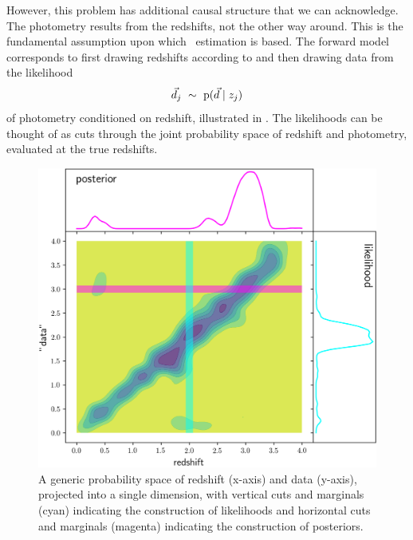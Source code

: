 However, this problem has additional causal structure that we can acknowledge.
The photometry results from the redshifts, not the other way around.
This is the fundamental assumption upon which \pz\ estimation is based.
The forward model corresponds to first drawing redshifts according to  and then drawing data from the likelihood
\begin{equation}
\label{eqn:pzpdf}
\vec{d}_{j}\ \sim\ \mathrm{p}(\vec{d} \mid z_{j})
\end{equation}
of photometry conditioned on redshift, illustrated in .
The likelihoods can be thought of as cuts through the joint probability space of redshift and photometry, evaluated at the true redshifts.

\begin{figure}
	\begin{center}
		\includegraphics[width=\textwidth]{figures/chippr/jain05.png}
		\caption{
			A generic probability space of redshift (x-axis) and data (y-axis), projected into a single dimension, with vertical cuts and marginals (cyan) indicating the construction of likelihoods and horizontal cuts and marginals (magenta) indicating the construction of posteriors.
		}
	\end{center}
\end{figure}

